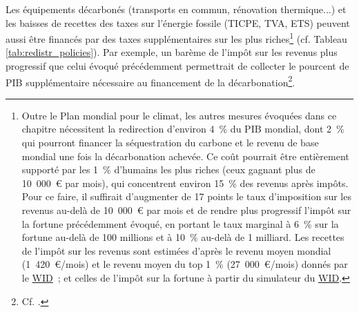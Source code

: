 \documentclass[a5paper,french,openany]{memoir}
\begin{document}
Les équipements décarbonés (transports en commun, rénovation thermique...) et les baisses de recettes des taxes sur l'énergie fossile (TICPE, TVA, ETS) peuvent aussi être financés par des taxes supplémentaires sur les plus riches\footnote{Outre le Plan mondial pour le climat, les autres mesures évoquées dans ce chapitre nécessitent la redirection d'environ 4~\% du PIB mondial, dont 2~\% qui pourront financer la séquestration du carbone et le revenu de base mondial une fois la décarbonation achevée. %
Ce coût pourrait être entièrement supporté par les 1~\% d'humains les plus riches (ceux gagnant plus de 10~000~\euro{} par mois), qui concentrent environ 15~\% des revenus après impôts. Pour ce faire, il suffirait d'augmenter de 17 points le taux d'imposition sur les revenus au-delà de 10~000~\euro{} par mois et de rendre plus progressif l'impôt sur la fortune précédemment évoqué, en portant le taux marginal à 6~\% sur la fortune au-delà de 100 millions et à 10~\% au-delà de 1 milliard. Les recettes de l'impôt sur les revenus sont estimées d'après le revenu moyen mondial (1~420~\euro{}/mois) et le revenu moyen du top 1~\% (27~000~\euro{}/mois) donnés par le \href{https://wid.world/income-comparator/}{WID}~; et celles de l'impôt sur la fortune à partir du simulateur du \href{https://wid.world/world-wealth-tax-simulator/}{WID}.%
} (cf. Tableau \ref{tab:redistr_policies}). 
Par exemple, un barème de l'impôt sur les revenus %
plus progressif que celui évoqué précédemment permettrait de collecter le pourcent de PIB supplémentaire nécessaire au financement de la décarbonation\footnote{Cf. \cite{aie_net_2021}.}. 
\end{document}
